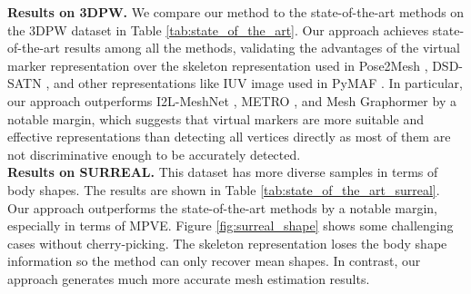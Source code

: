 \noindent\textbf{Results on 3DPW.}
We compare our method to the state-of-the-art methods on the 3DPW dataset in Table \ref{tab:state_of_the_art}. Our approach achieves state-of-the-art results among all the methods, validating the advantages of the virtual marker representation over the skeleton representation used in Pose2Mesh \cite{choi2020pose2mesh}, DSD-SATN \cite{sun2019human}, and other representations like IUV image used in PyMAF \cite{zhang2021pymaf}. In particular, our approach outperforms I2L-MeshNet \cite{moon2020i2l}, METRO \cite{lin2021end}, and Mesh Graphormer \cite{Lin_2021_ICCV} by a notable margin, which suggests that 
virtual markers are more suitable and effective representations than detecting all vertices directly as most of them are not discriminative enough to be accurately detected. \\

\noindent\textbf{Results on SURREAL.}
This dataset has more diverse samples in terms of body shapes. The results are shown in Table \ref{tab:state_of_the_art_surreal}. Our approach outperforms the state-of-the-art methods by a notable margin, especially in terms of MPVE. Figure \ref{fig:surreal_shape} shows some challenging cases without cherry-picking. The skeleton representation loses the body shape information so the method \cite{choi2020pose2mesh} can only recover mean shapes. In contrast, our approach generates much more accurate mesh estimation results. 

\begin{table}[t]
\center
\small
\setlength{\tabcolsep}{10pt}
\caption{Ablation study of the virtual marker representation for our approach on H3.6M and SURREAL datasets. 
``Skeleton'' means the sparse landmark joint representation is used. 
``Rand virtual marker'' means the virtual markers are randomly selected from all the vertices without learning. (c) is our method, where the learned virtual markers are used. }
\label{tab:ba_effect}
\vspace{-0.4cm}
\end{table}



